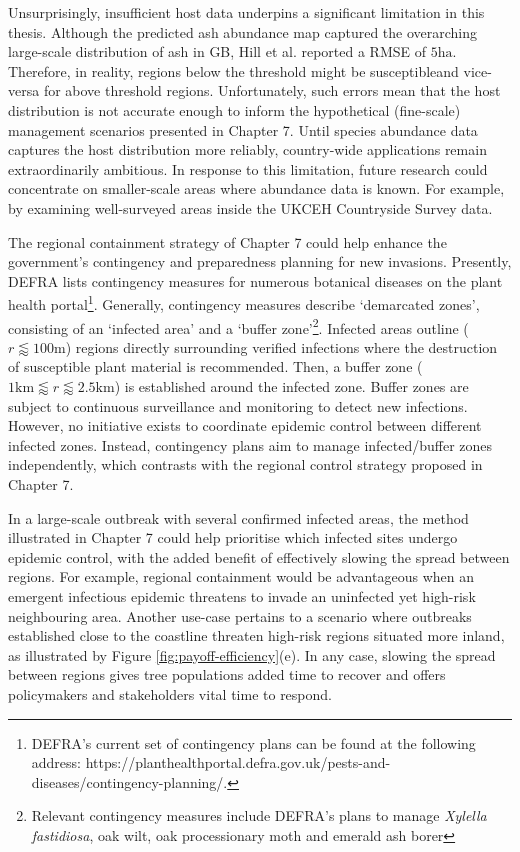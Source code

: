 Unsurprisingly, insufficient host data underpins a significant limitation in this thesis.
Although the predicted ash abundance map captured the overarching large-scale distribution of ash in GB, Hill et al. reported a RMSE of $5\mathrm{ha}$. Therefore, in reality, regions below the threshold might be susceptible\textemdash and vice-versa for above threshold regions. Unfortunately, such errors mean that the host distribution is not accurate enough to inform the hypothetical (fine-scale) management scenarios presented in Chapter 7. Until species abundance data captures the host distribution more reliably, country-wide applications remain extraordinarily ambitious. In response to this limitation, future research could concentrate on smaller-scale areas where abundance data is known. For example, by examining well-surveyed areas inside the UKCEH Countryside Survey data.

The regional containment strategy of Chapter 7 could help enhance the government's contingency and preparedness planning for new invasions. Presently, DEFRA lists contingency measures for numerous botanical diseases on the plant health portal\footnote{DEFRA's current set of contingency plans can be found at the following address: https://planthealthportal.defra.gov.uk/pests-and-diseases/contingency-planning/.}. Generally, contingency measures describe `demarcated zones', consisting of an `infected area' and a `buffer zone'\footnote{Relevant contingency measures include DEFRA's plans to manage \textit{Xylella fastidiosa}, oak wilt, oak processionary moth and emerald ash borer}. Infected areas outline  ($r \lessapprox 100 \mathrm{m}$) regions directly surrounding verified infections where the destruction of susceptible plant material is recommended. Then, a buffer zone ($1 \mathrm{km} \lessapprox  r \lessapprox 2.5 \mathrm{km}$) is established around the infected zone. Buffer zones are subject to continuous surveillance and monitoring to detect new infections. However, no initiative exists to coordinate epidemic control between different infected zones. Instead, contingency plans aim to manage infected/buffer zones independently, which contrasts with the regional control strategy proposed in Chapter 7.

In a large-scale outbreak with several confirmed infected areas, the method illustrated in Chapter 7 could help prioritise which infected sites undergo epidemic control, with the added benefit of effectively slowing the spread between regions. For example, regional containment would be advantageous when an emergent infectious epidemic threatens to invade an uninfected yet high-risk neighbouring area. Another use-case pertains to a scenario where outbreaks established close to the coastline threaten high-risk regions situated more inland, as illustrated by Figure \ref{fig:payoff-efficiency}(e). In any case, slowing the spread between regions gives tree populations added time to recover and offers policymakers and stakeholders vital time to respond. 

